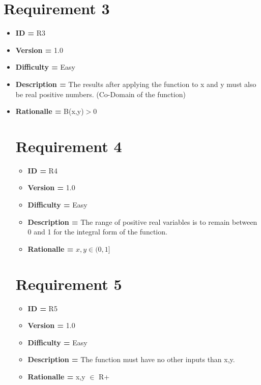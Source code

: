 \documentclass{article}
\begin{document}
    \section*{Requirement 3}
    \begin{itemize}[noitemsep]
            \item \textbf{ID = } R3
            \item\textbf{Version = } 1.0
            \item\textbf{Difficulty = } Easy
            \item\textbf{Description = } The results after applying the function to x and y must also be real positive numbers. (Co-Domain of the function)
            \item\textbf{Rationalle = } B(x,y)$>$0
        
    \section*{Requirement 4}
    \begin{itemize}[noitemsep]
            \item \textbf{ID = } R4
            \item\textbf{Version = } 1.0
            \item\textbf{Difficulty = } Easy
            \item\textbf{Description = } The range of positive real variables is to remain between 0 and 1 for the integral form of the function.
            \item\textbf{Rationalle = } $x,y \in (0,1]$ 
        \end{itemize}
        
    \section*{Requirement 5}
    \begin{itemize}[noitemsep]
            \item \textbf{ID = } R5
            \item\textbf{Version = } 1.0
            \item\textbf{Difficulty = } Easy
            \item\textbf{Description = } The function must have no other inputs than x,y.
            \item\textbf{Rationalle = } x,y $\in$ R+ 
        \end{itemize}
        

\end{itemize}
\end{document}
